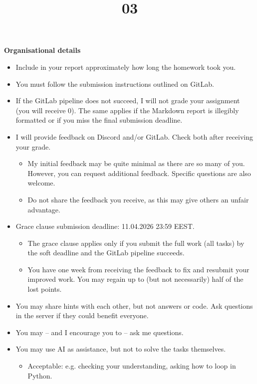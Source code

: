 \documentclass{homework}
\title{03}
\begin{document}
\maketitle

\textbf{Organisational details}

\begin{itemize}
  \item Include in your report approximately how long the homework took you.
  \item You must follow the submission instructions outlined on GitLab.
  \item If the GitLab pipeline does not succeed, I will not grade your assignment (you will receive 0).
  The same applies if the Markdown report is illegibly formatted or if you miss the final submission deadline.
  \item I will provide feedback on Discord and/or GitLab.
  Check both after receiving your grade.
  \begin{itemize}
    \item My initial feedback may be quite minimal as there are so many of you.
    However, you can request additional feedback.
    Specific questions are also welcome.
    \item Do not share the feedback you receive, as this may give others an unfair advantage.
  \end{itemize}
  \item Grace clause submission deadline: 11.04.2026 23:59 EEST.
  \begin{itemize}
    \item The grace clause applies only if you submit the full work (all tasks) by the soft deadline and the GitLab pipeline succeeds.
    \item You have one week from receiving the feedback to fix and resubmit your improved work.
    You may regain up to (but not necessarily) half of the lost points.
  \end{itemize}
  \item You may share hints with each other, but not answers or code.
  Ask questions in the server if they could benefit everyone.
  \item You may -- and I encourage you to -- ask me questions.
  \item You may use AI as assistance, but not to solve the tasks themselves.
  \begin{itemize}
    \item Acceptable: e.g. checking your understanding, asking how to loop in Python.

\end{itemize}
\end{itemize}
\end{document}
